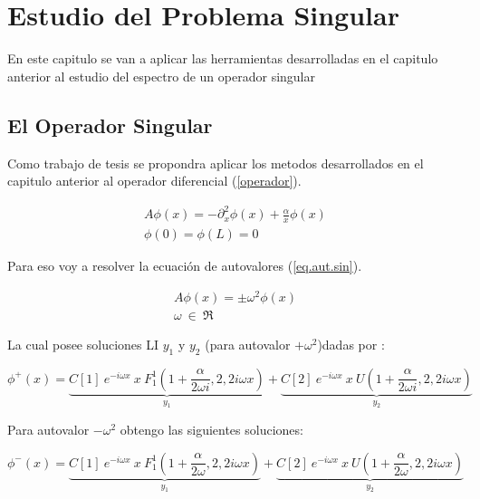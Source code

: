 
\chapter{Estudio del Problema Singular}

En este capitulo se van a aplicar las herramientas desarrolladas en el capitulo anterior al estudio del espectro de un operador singular

\section{El Operador Singular}

Como trabajo de tesis se propondra aplicar los metodos desarrollados en el capitulo anterior al operador diferencial (\ref{operador}).

\begin{equation}
\begin{array}{c}
    A \phi (x) = - \partial ^2 _x  \phi(x) + \frac{\alpha}{x} \phi(x) \\
    \phi(0) = \phi(L) = 0 
\end{array}
\label{operador}
\end{equation}

Para eso voy a resolver la ecuación de autovalores (\ref{eq.aut.sin}).

\begin{equation}
\begin{array}{c}
    A  \phi (x)  =  \pm \omega ^2 \phi (x) \\ 
    \omega \ \in \ \mathfrak{R}
\end{array}
\label{eq.aut.sin}
\end{equation}

La cual posee soluciones LI $ y_1 $ y $ y_2 $ (para autovalor $+ \omega ^2$)dadas por :

\begin{equation}
    \phi ^{+} (x) = 
    \underbrace{
    C[1] \ e ^{-i \omega x} \ x \ F _{1} ^{1} (1+\frac{ \alpha}{2 \omega i },2,2 i \omega x) } _ {y_1}
    + \underbrace{C[2] \ e^{-i \omega x } \ x \ U (1+\frac{ \alpha}{2 \omega i },2,2 i \omega x) } _{y_2} 
\end{equation}


Para autovalor $- \omega ^2 $ obtengo las siguientes soluciones:

\begin{equation}
    \phi ^{-} (x) = 
    \underbrace{
    C[1] \ e ^{-i \omega x} \ x \ F _{1} ^{1} (1 + \frac{ \alpha}{2 \omega},2,2 i \omega x) } _ {y_1}
    + \underbrace{C[2] \ e^{-i \omega x } \ x \ U (1 + \frac{ \alpha}{2 \omega},2,2 i \omega x) } _{y_2} 
\end{equation}

